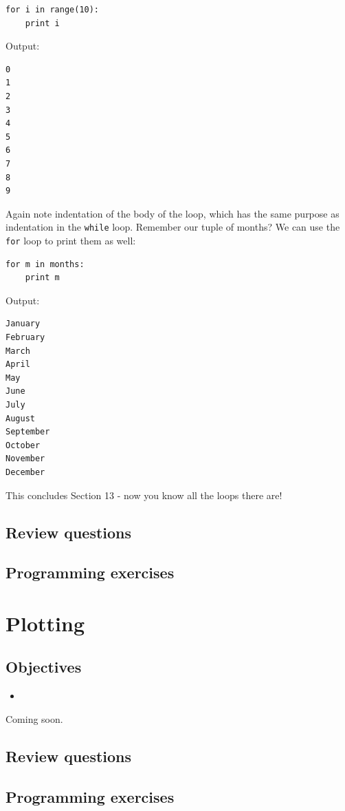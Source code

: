 \begin{verbatim}
for i in range(10):
    print i
\end{verbatim}
Output:

\begin{verbatim}
0
1
2
3
4
5
6
7
8
9
\end{verbatim}
Again note indentation of the body of the loop, which has the same 
purpose as indentation in the {\tt while} loop. Remember our tuple
of months? We can use the {\tt for} loop to print them as well:

\begin{verbatim}
for m in months:
    print m
\end{verbatim}
Output:

\begin{verbatim}
January
February
March
April
May
June
July
August
September
October
November
December
\end{verbatim}
This concludes Section 13 - now you know all the loops there are!

\subsection{Review questions}

\subsection{Programming exercises}


\section{Plotting}

\subsection{Objectives}

\begin{itemize}
\item
\end{itemize}
Coming soon.

\subsection{Review questions}

\subsection{Programming exercises}


